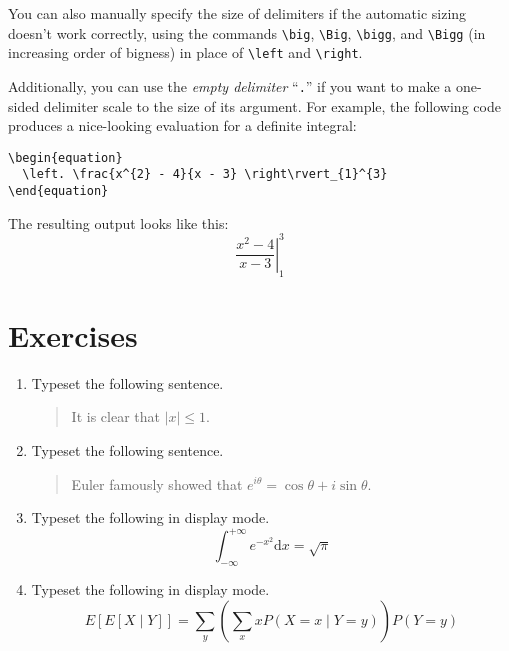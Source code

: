 \documentclass{article}
\newcommand*{\code}[1]{\texttt{#1}}
\begin{document}
You can also manually specify the size of delimiters if the automatic sizing doesn't work correctly, using the commands \code{\textbackslash{}big}, \code{\textbackslash{}Big}, \code{\textbackslash{}bigg}, and \code{\textbackslash{}Bigg} (in increasing order of bigness) in place of \code{\textbackslash{}left} and \code{\textbackslash{}right}.

Additionally, you can use the \emph{empty delimiter} \enquote{\code{.}} if you want to make a one-sided delimiter scale to the size of its argument.
For example, the following code produces a nice-looking evaluation for a definite integral:
\begin{verbatim}
\begin{equation}
  \left. \frac{x^{2} - 4}{x - 3} \right\rvert_{1}^{3}
\end{equation}
\end{verbatim}
The resulting output looks like this:
\begin{equation}
  \label{eq:evalex}
  \left. \frac{x^{2} - 4}{x - 3} \right\rvert_{1}^{3}
\end{equation}

\section{Exercises}
\begin{enumerate}
\item
  Typeset the following sentence.
  \begin{quote}
    It is clear that $\left\lvert x \right\rvert \leq 1$.
  \end{quote}

\item
  Typeset the following sentence.
  \begin{quote}
    Euler famously showed that $e^{i \theta} = \cos \theta + i \sin \theta$.
  \end{quote}

\item
  Typeset the following in display mode.
  \begin{equation*}
    \int_{-\infty}^{+\infty} e^{-x^{2}} \mathrm{d}x = \sqrt{\pi}
  \end{equation*}

\item
  Typeset the following in display mode.
  \begin{equation*}
    E \left[ E \left[ X \mid Y \right] \right] =
    \sum_{y} \left( \sum_{x} x P \left( X = x \mid Y = y \right) \right) P \left( Y = y \right)
  \end{equation*}
\end{enumerate}
\end{document}

